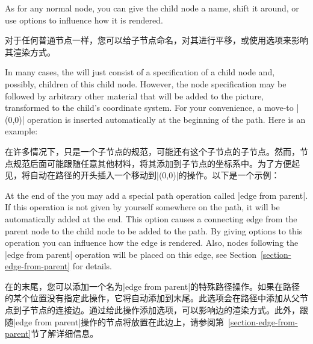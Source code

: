 As for any normal node, you can give the child node a name, shift it around, or
use options to influence how it is rendered.

对于任何普通节点一样，您可以给子节点命名，对其进行平移，或使用选项来影响其渲染方式。

\begin{codeexample}[preamble={\usetikzlibrary{shapes.geometric}}]
\end{codeexample}

In many cases, the  will just consist of a specification of a
child node and, possibly, children of this child node. However, the node
specification may be followed by arbitrary other material that will be added to
the picture, transformed to the child's coordinate system. For your
convenience, a move-to |(0,0)| operation is inserted automatically at the
beginning of the path. Here is an example:

在许多情况下，只是一个子节点的规范，可能还有这个子节点的子节点。然而，节点规范后面可能跟随任意其他材料，将其添加到子节点的坐标系中。为了方便起见，将自动在路径的开头插入一个移动到|(0,0)|的操作。以下是一个示例：

\begin{codeexample}[]
\end{codeexample}

At the end of the  you may add a special path operation called
|edge from parent|. If this operation is not given by yourself somewhere on the
path, it will be automatically added at the end. This option causes a
connecting edge from the parent node to the child node to be added to the path.
By giving options to this operation you can influence how the edge is rendered.
Also, nodes following the |edge from parent| operation will be placed on this
edge, see Section~\ref{section-edge-from-parent} for details.

在的末尾，您可以添加一个名为|edge from parent|的特殊路径操作。如果在路径的某个位置没有指定此操作，它将自动添加到末尾。此选项会在路径中添加从父节点到子节点的连接边。通过给此操作添加选项，可以影响边的渲染方式。此外，跟随|edge from parent|操作的节点将放置在此边上，请参阅第~\ref{section-edge-from-parent}节了解详细信息。


